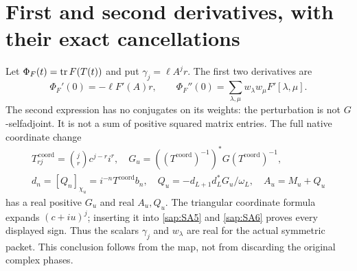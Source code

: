 \section{First and second derivatives, with their exact cancellations}

Let $\Phi_F(t)=\operatorname{tr} F(T(t))$ and put $\gamma_j=\ell A^jr$.
The first two derivatives are
\begin{equation}\tag{SA20}\label{sap:SA20}
\Phi_F'(0)=-\ell F'(A)r,\qquad
\Phi_F''(0)=
\sum_{\lambda,\mu}w_\lambda w_\mu F'[\lambda,\mu].
\end{equation}
The second expression has no conjugates on its weights:
the perturbation is not $G$-selfadjoint. It is not a sum
of positive squared matrix entries.
The full native coordinate change
\begin{equation}\tag{SA21}\label{sap:SA21}
\begin{gathered}
T_{rj}^{\,\mathrm{coord}}=\binom jr c^{j-r}i^r,\quad
G_u=((T^{\mathrm{coord}})^{-1})^*G
                 (T^{\mathrm{coord}})^{-1},\\
d_n=[Q_n]_{\chi_u}=i^{-n}T^{\mathrm{coord}}b_n,\quad
Q_u=-d_{L+1}d_L^*G_u/\omega_L,\quad
A_u=M_u+Q_u
\end{gathered}
\end{equation}
has a real positive $G_u$ and real $A_u,Q_u$.
The triangular coordinate formula expands $(c+iu)^j$;
inserting it into \eqref{sap:SA5} and \eqref{sap:SA6} proves
every displayed sign. Thus the scalars $\gamma_j$ and
$w_\lambda$ are real for the actual symmetric packet.
This conclusion follows from the map, not from discarding
the original complex phases.


